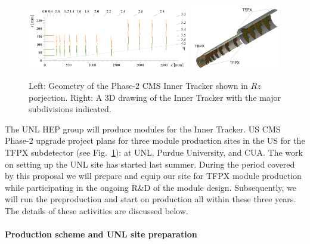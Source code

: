 \begin{figure}
\centering\includegraphics[width=0.63\textwidth]{figs/phase2_inner_tracker_geometry_lowres.png}
\centering\includegraphics[width=0.35\textwidth]{figs/phsae2_inner_tracker_3D.png}
\caption{\label{fig:TFPX} Left: Geometry of the Phase-2 CMS Inner Tracker shown in $Rz$ porjection. Right: A 3D drawing of the Inner Tracker with the major subdivisions indicated.}
\end{figure}

The UNL HEP group will produce modules for the Inner Tracker. US CMS Phase-2 upgrade project plans for three module production sites in the US for the TFPX subdetector (see Fig.~\ref{fig:TFPX}): at UNL, Purdue University, and CUA. The work on setting up the UNL site has started last summer. During the period covered by this proposal we will prepare and equip our site for TFPX module production while participating in the ongoing R\&D of the module design. Subsequently, we will run the preproduction and start on production all within these three years. The details of these activities are discussed below.

\paragraph{Production scheme and UNL site preparation}

